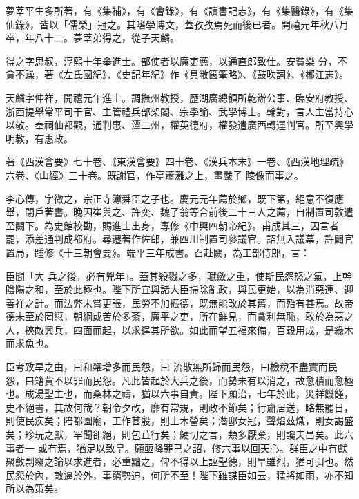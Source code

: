\begin{pinyinscope}
 夢莘平生多所著，有《集補》，有《會錄》，有《讀書記志》，有《集醫錄》，有《集仙錄》，皆以「儒榮」冠之。其嗜學博文，蓋孜孜焉死而後已者。開禧元年秋八月卒，年八十二。夢莘弟得之，從子天麟。



 得之字思叔，淳熙十年舉進士。部使者以廉吏薦，以通直郎致仕。安貧樂
 分，不貪不躁，著《左氏國紀》、《史記年紀》作《具敝篋筆略》、《鼓吹詞》、《郴江志》。



 天麟字仲祥，開禧元年進士。調撫州教授，歷湖廣總領所乾辦公事、臨安府教授、浙西提舉常平司干官、主管禮兵部架閣、宗學諭、武學博士。輪對，言人主當持心以敬。奉祠仙都觀，通判惠、潭二州，權英德府，權發遣廣西轉運判官。所至興學明教，有惠政。



 著《西漢會要》七十卷、《東漢會要》四十卷、《漢兵本末》一卷、《西漢地理疏》六卷、《山經》三十卷。既謝官，作亭蕭灘之上，畫嚴子
 陵像而事之。



 李心傳，字微之，宗正寺簿舜臣之子也。慶元元年薦於鄉，既下第，絕意不復應舉，閉戶著書。晚因崔與之、許奕、魏了翁等合前後二十三人之薦，自制置司敦遣至闕下。為史館校勘，賜進士出身，專修《中興四朝帝紀》。甫成其三，因言者罷，添差通判成都府。尋遷著作佐郎，兼四川制置司參議官。詔無入議幕，許闢官置局，踵修《十三朝會要》。端平三年成書。召赴闕，為工部侍郎，言：



 臣聞「大
 兵之後，必有兇年」。蓋其殺戮之多，賦斂之重，使斯民怨怒之氣，上幹陰陽之和，至於此極也。陛下所宜與諸大臣掃除亂政，與民更始，以為消惡運、迎善祥之計。而法弊未嘗更張，民勞不加振德，既無能改於其舊，而殆有甚焉。故帝德未至於罔愆，朝綱或苦於多紊，廉平之吏，所在鮮見，而貪利無恥，敢於為惡之人，挾敵興兵，四面而起，以求逞其所欲。如此而望五福來備，百穀用成，是緣木而求魚也。



 臣考致旱之由，曰和糴增多而民怨，曰
 流散無所歸而民怨，曰檢稅不盡實而民怨，曰籍貲不以罪而民怨。凡此皆起於大兵之後，而勢未有以消之，故愈積而愈極也。成湯聖主也，而桑林之禱，猶以六事自責。陛下願治，七年於此，災祥饑饉，史不絕書，其故何哉？朝令夕改，靡有常規，則政不節矣；行齎居送，略無罷日，則使民疾矣；陪都園廟，工作甚殷，則土木營矣；潛邸女冠，聲焰茲熾，則女謁盛矣；珍玩之獻，罕聞卻絕，則包苴行矣；鯁切之言，類多厭棄，則讒夫昌矣。此六事者一
 或有焉，猶足以致旱。願亟降罪己之詔，修六事以回天心。群臣之中有獻聚斂剽竊之論以求進者，必重黜之，俾不得以上誣聖德，則旱雖烈，猶可弭也。然民怨於內，敵逼於外，事窮勢迫，何所不至！陛下雖謀臣如云，猛將如雨，亦不知所以為策矣。




\end{pinyinscope}
